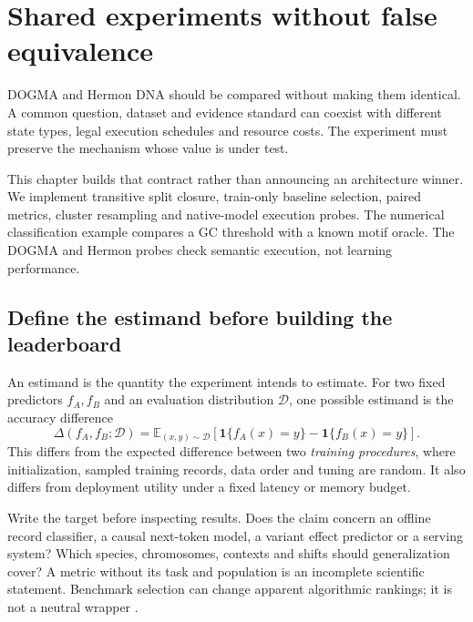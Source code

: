 \chapter{Shared experiments without false equivalence}
DOGMA and Hermon DNA should be compared without making them identical.
A common question, dataset and evidence standard can coexist with different
state types, legal execution schedules and resource costs. The experiment must
preserve the mechanism whose value is under test.

This chapter builds that contract rather than announcing an architecture winner.
We implement transitive split closure, train-only baseline selection, paired
metrics, cluster resampling and native-model execution probes. The numerical
classification example compares a GC threshold with a known motif oracle.
The DOGMA and Hermon probes check semantic execution, not learning performance.

\section{Define the estimand before building the leaderboard}
An estimand is the quantity the experiment intends to estimate.
For two fixed predictors $f_A,f_B$ and an evaluation distribution $\mathcal D$,
one possible estimand is the accuracy difference
\begin{equation}
\Delta(f_A,f_B;\mathcal D)=
\mathbb E_{(x,y)\sim\mathcal D}
[\mathbf1\{f_A(x)=y\}-\mathbf1\{f_B(x)=y\}].
\label{evod25:estimand}
\end{equation}
This differs from the expected difference between two \emph{training procedures},
where initialization, sampled training records, data order and tuning are random.
It also differs from deployment utility under a fixed latency or memory budget.

Write the target before inspecting results. Does the claim concern an offline
record classifier, a causal next-token model, a variant effect predictor or
a serving system? Which species, chromosomes, contexts and shifts should
generalization cover? A metric without its task and population is an incomplete
scientific statement. Benchmark selection can change apparent algorithmic
rankings; it is not a neutral wrapper \cite{lottery}.


